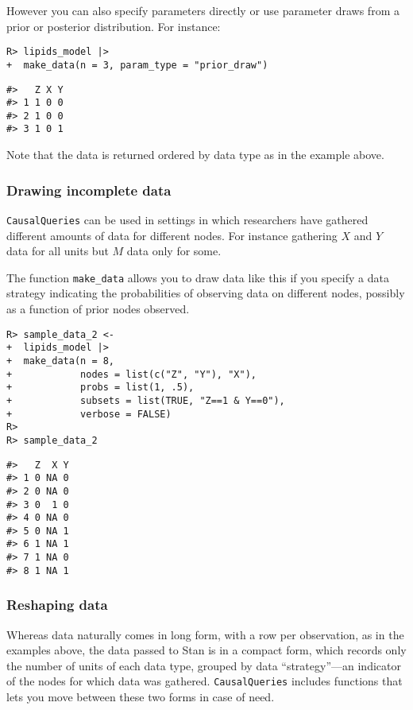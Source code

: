 \documentclass[
  11pt,
  article]{jss}
\begin{document}
However you can also specify parameters directly or use parameter draws
from a prior or posterior distribution. For instance:

\begin{verbatim}
R> lipids_model |>
+  make_data(n = 3, param_type = "prior_draw")
\end{verbatim}

\begin{verbatim}
#>   Z X Y
#> 1 1 0 0
#> 2 1 0 0
#> 3 1 0 1
\end{verbatim}

Note that the data is returned ordered by data type as in the example
above.

\hypertarget{drawing-incomplete-data}{%
\subsubsection{Drawing incomplete data}\label{drawing-incomplete-data}}

\texttt{CausalQueries} can be used in settings in which researchers have
gathered different amounts of data for different nodes. For instance
gathering \(X\) and \(Y\) data for all units but \(M\) data only for
some.

The function \texttt{make\_data} allows you to draw data like this if
you specify a data strategy indicating the probabilities of observing
data on different nodes, possibly as a function of prior nodes observed.

\begin{verbatim}
R> sample_data_2 <-
+  lipids_model |>
+  make_data(n = 8,
+            nodes = list(c("Z", "Y"), "X"),
+            probs = list(1, .5),
+            subsets = list(TRUE, "Z==1 & Y==0"),
+            verbose = FALSE)
R> 
R> sample_data_2
\end{verbatim}

\begin{verbatim}
#>   Z  X Y
#> 1 0 NA 0
#> 2 0 NA 0
#> 3 0  1 0
#> 4 0 NA 0
#> 5 0 NA 1
#> 6 1 NA 1
#> 7 1 NA 0
#> 8 1 NA 1
\end{verbatim}

\hypertarget{reshaping-data}{%
\subsubsection{Reshaping data}\label{reshaping-data}}

Whereas data naturally comes in long form, with a row per observation,
as in the examples above, the data passed to Stan is in a compact form,
which records only the number of units of each data type, grouped by
data ``strategy''---an indicator of the nodes for which data was
gathered. \texttt{CausalQueries} includes functions that lets you move
between these two forms in case of need.
\end{document}
